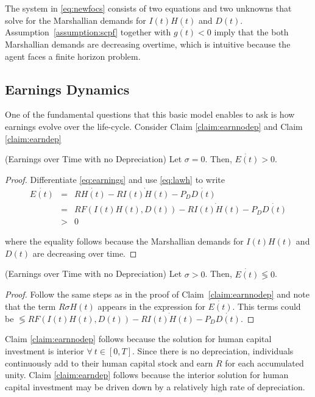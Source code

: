 \indent The system in \eqref{eq:newfocs} consists of two equations and two unknowns that solve for the Marshallian demands for $I(t)H(t)$ and $D(t)$. Assumption~\ref{assumption:scpf} together with $\dot{g(t)} < 0$ imply that the both Marshallian demands are decreasing overtime, which is intuitive because the agent faces a finite horizon problem.

\subsection{Earnings Dynamics}
\indent One of the fundamental questions that this basic model enables to ask is how earnings evolve over the life-cycle. Consider Claim \ref{claim:earnnodep} and Claim \ref{claim:earndep}

\begin{claim} (Earnings over Time with no Depreciation) \label{claim:earnnodep}
Let $\sigma = 0$. Then, $\dot{E(t)} > 0$.
\end{claim}

\begin{proof}
Differentiate \eqref{eq:earnings} and use \eqref{eq:lawh} to write
\begin{eqnarray}
\dot{E(t)} &=& R \dot{H(t)} - R \dot{I(t)H(t)} - P_{D} \dot{D(t)} \nonumber \\
           &=& R F \left( I(t) H(t), D(t) \right) - R \dot{I(t)H(t)} - P_{D} \dot{D(t)} \nonumber \\     
           &>& 0 
\end{eqnarray}

\noindent where the equality follows because the Marshallian demands for $I(t)H(t)$ and $D(t)$ are decreasing over time.
\end{proof}

\begin{claim} (Earnings over Time with no Depreciation) \label{claim:earndep}
Let $\sigma > 0$. Then, $\dot{E(t)} \lessgtr 0$. 
\end{claim}

\begin{proof}
Follow the same steps as in the proof of Claim~\ref{claim:earnnodep} and note that the term $R \sigma H(t)$ appears in the expression for $\dot{E(t)}$. This terms could be $\lessgtr R F \left( I(t) H(t), D(t) \right) - R \dot{I(t)H(t)} - P_{D} \dot{D(t)} $.
\end{proof}

\indent Claim \ref{claim:earnnodep} follows because the solution for human capital investment is interior $\forall \ t \in [0,T]$. Since there is no depreciation, individuals continuously add to their human capital stock and earn $R$ for each accumulated unity. Claim \ref{claim:earndep} follows because the interior solution for human capital investment may be driven down by a relatively high rate of depreciation.


